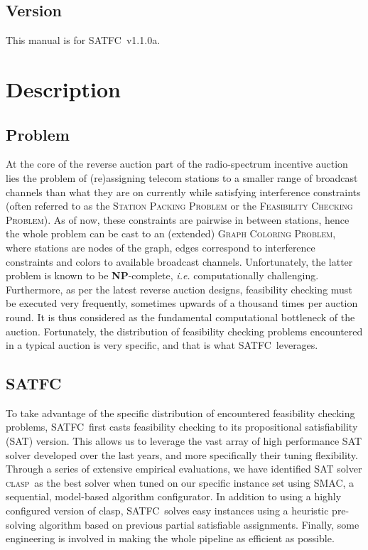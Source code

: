 \documentclass[
10pt, %
a4paper, %
oneside, %
headinclude,footinclude, %
BCOR5mm, %
]{scrartcl}
\newcommand{\SATFC}{\textsc{SATFC}~}
\newcommand{\clasp}{\textsc{clasp}~}
\begin{document}
\subsection{Version}
This manual is for \SATFC v1.1.0a.

\section{Description}

\subsection{Problem}
At the core of the reverse auction part of the radio-spectrum incentive auction lies the problem of (re)assigning telecom stations to a smaller range of broadcast channels than what they are on currently while satisfying interference constraints (often referred to as the \textsc{Station Packing Problem} or the \textsc{Feasibility Checking Problem}). As of now, these constraints are pairwise in between stations, hence the whole problem can be cast to an (extended) \textsc{Graph Coloring Problem}, where stations are nodes of the graph, edges correspond to interference constraints and colors to available broadcast channels. Unfortunately, the latter problem is known to be \textbf{NP}-complete, \emph{i.e.} computationally challenging. Furthermore, as per the latest reverse auction designs, feasibility checking must be executed very frequently, sometimes upwards of a thousand times per auction round. It is thus considered as the fundamental computational bottleneck of the auction. Fortunately, the distribution of feasibility checking problems encountered in a typical auction is very specific, and that is what \SATFC leverages.

\subsection{\SATFC}
To take advantage of the specific distribution of encountered feasibility checking problems, \SATFC first casts feasibility checking to its propositional satisfiability (SAT) version. This allows us to leverage the vast array of high performance SAT solver developed over the last years, and more specifically their tuning flexibility. Through a series of extensive empirical evaluations, we have identified SAT solver \clasp as the best solver when tuned on our specific instance set using SMAC, a sequential, model-based algorithm configurator. In addition to using a highly configured version of clasp, \SATFC solves easy instances using a heuristic pre-solving algorithm based on previous partial satisfiable assignments. Finally, some engineering is involved in making the whole pipeline as efficient as possible.
\end{document}
